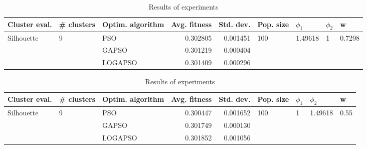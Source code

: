 \documentclass{article}
\begin{document}
\begin{table}
\centering
\caption{Results of experiments}
\begin{tabular}{lllrrllll}
\toprule
              Cluster eval. &        \# clusters & Optim. algorithm &  Avg. fitness &  Std. dev. &            Pop. size &               $\phi_{1}$ &         $\phi_{2}$ &                       w \\
\midrule
\multirow{3}{*}{Silhouette} & \multirow{3}{*}{9} &              PSO &      0.302805 &   0.001451 & \multirow{3}{*}{100} & \multirow{3}{*}{1.49618} & \multirow{3}{*}{1} & \multirow{3}{*}{0.7298} \\
                            &                    &            GAPSO &      0.301219 &   0.000404 &                      &                          &                    &                         \\
                            &                    &          LOGAPSO &      0.301409 &   0.000296 &                      &                          &                    &                         \\
\bottomrule
\end{tabular}
\end{table}
\begin{table}
\centering
\caption{Results of experiments}
\begin{tabular}{lllrrllll}
\toprule
              Cluster eval. &        \# clusters & Optim. algorithm &  Avg. fitness &  Std. dev. &            Pop. size &         $\phi_{1}$ &               $\phi_{2}$ &                     w \\
\midrule
\multirow{3}{*}{Silhouette} & \multirow{3}{*}{9} &              PSO &      0.300447 &   0.001652 & \multirow{3}{*}{100} & \multirow{3}{*}{1} & \multirow{3}{*}{1.49618} & \multirow{3}{*}{0.55} \\
                            &                    &            GAPSO &      0.301749 &   0.000130 &                      &                    &                          &                       \\
                            &                    &          LOGAPSO &      0.301852 &   0.001056 &                      &                    &                          &                       \\
\bottomrule
\end{tabular}
\end{table}
\end{document}
